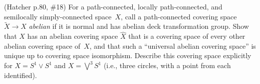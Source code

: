\prob (Hatcher p.80, \#18) For a path-connected, locally path-connected, and semilocally simply-connected space~$X$, call a path-connected covering space $\tilde X\to X$ \emph{abelian} if it is normal and has abelian deck transformation group.  Show that $X$ has an abelian covering space $\hat X$ that is a covering space of every other abelian covering space of~$X$, and that such a ``universal abelian covering space'' is unique up to covering space isomorphism.  Describe this covering space explicitly for $X=S^1\vee S^1$ and $X=\bigvee^3 S^1$ (i.e., three circles, with a point from each identified).

